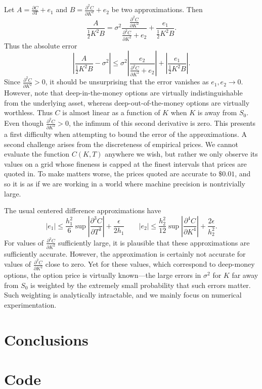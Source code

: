 \documentclass[12pt]{article}
\numberwithin{equation}{section}
\newcommand{\diff}[2]{\frac{\partial #1}{\partial #2}}
\newcommand{\abs}[1]{\left|#1\right|}
\begin{document}
Let $A = \diff{C}{T} + e_1$ and $B = \diff{^2C}{K^2} + e_2$ be two approximations. Then \[
\frac{A}{\frac{1}{2}K^2 B} = \sigma^2 \frac{\diff{^2C}{K^2}}{\diff{^2C}{K^2} + e_2} + \frac{e_1}{\frac{1}{2}K^2 B}.
\]
Thus the absolute error \[
\abs{\frac{A}{\frac{1}{2}K^2 B} - \sigma^2} \le \sigma^2 \abs{\frac{e_2}{\diff{^2C}{K^2}+e_2}} + \abs{\frac{e_1}{\frac{1}{2}K^2B}}.
\]
Since $\diff{^2C}{K^2} > 0$, it should be unsurprising that the error vanishes as $e_1,e_2 \to 0$. However, note that deep-in-the-money options are virtually indistinguishable from the underlying asset, whereas deep-out-of-the-money options are virtually worthless. Thus $C$ is almost linear as a function of $K$ when $K$ is away from $S_0$.
Even though $\diff{^2C}{K^2} > 0$, the infimum of this second derivative is zero. This presents a first difficulty when attempting to bound the error of the approximations. A second challenge arises from the discreteness of empirical prices. We cannot evaluate the function $C(K,T)$ anywhere we wish, but rather we only observe its values on a grid whose fineness is capped at the finest intervals that prices are quoted in. To make matters worse, the prices quoted are accurate to $\$0.01$, and so it is as if we are working in a world where machine precision is nontrivially large.


The usual centered difference approximations have \[
|e_1|\le \frac{h_1^2}{6}\sup \abs{\diff{^3C}{T^3}} + \frac{\epsilon}{2h_1} \qquad |e_2| \le \frac{h_2^2}{12}\sup \abs{\diff{^4C}{K^4}} + \frac{2\epsilon}{h_2^2}.
\]
For values of $\diff{^2C}{K^2}$ sufficiently large, it is plausible that these approximations are sufficiently accurate. However, the approximation is certainly not accurate for values of $\diff{^2C}{K^2}$ close to zero. Yet for these values, which correspond to deep-money options, the option price is virtually known---the large errors in $\sigma^2$ for $K$ far away from $S_0$ is weighted by the extremely small probability that such errors matter. Such weighting is analytically intractable, and we mainly focus on numerical experimentation. 


\section{Conclusions}




\newpage

\appendix
\appendixpage

\section{Code}
\end{document}
